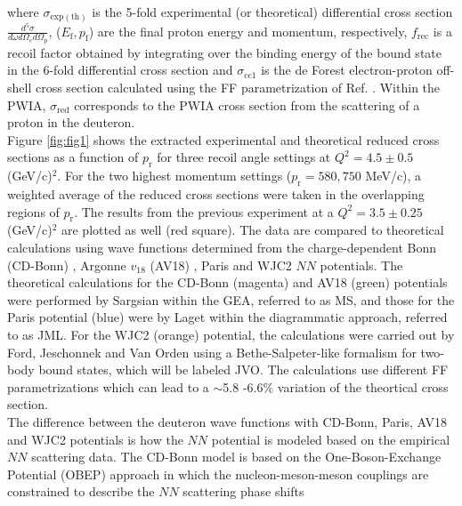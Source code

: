 \documentclass[aps,prl,twocolumn,showpacs,superscriptaddress,groupedaddress]{revtex4-2}  %
\begin{document}
\noindent where $\sigma_{\mathrm{exp(th)}}$ is the 5-fold experimental (or theoretical) differential cross section $\frac{d^{5}\sigma}{d\omega d\Omega_{e} d\Omega_{p}}$,
($E_{\mathrm{f}}, p_{\mathrm{f}}$) are the final proton energy and momentum, respectively, $f_{\mathrm{rec}}$ 
is a recoil factor \cite{cyero_phdthesis} obtained by integrating over the binding energy of the bound state in the 6-fold differential cross section and $\sigma_{\mathrm{cc1}}$ is the
de Forest \cite{DEFOREST1983} electron-proton off-shell cross section calculated using the FF parametrization of Ref. \cite{PhysRevC.69.022201}.
Within the PWIA, $\sigma_{\mathrm{red}}$ corresponds to the PWIA cross section from the scattering of a proton in the deuteron. \\
\indent Figure \ref{fig:fig1} shows the extracted experimental and theoretical reduced cross sections as a function of $p_{\mathrm{r}}$ for three recoil angle settings at $Q^{2}=4.5\pm0.5$ (GeV/c)$^{2}$.
For the two highest momentum settings ($p_{\mathrm{r}}=580, 750$ MeV/c), a weighted average of the reduced cross sections were taken in the overlapping regions of $p_{\mathrm{r}}$. The results from the previous experiment \cite{PhysRevLett.107.262501} at a $Q^{2}=3.5\pm0.25$ (GeV/c)$^{2}$ are plotted as well (red square).
The data are compared to theoretical calculations using wave functions determined from the charge-dependent Bonn (CD-Bonn) \cite{PhysRevC.63.024001}, Argonne $v_{18}$ (AV18) \cite{PhysRevC.51.38}, Paris \cite{PhysRevC.21.861} and WJC2 \cite{Gross_2007} $NN$ potentials. The theoretical calculations
for the CD-Bonn (magenta) and AV18 (green) potentials were performed by Sargsian \cite{PhysRevC.82.014612} within the GEA, referred to as MS, and those for the Paris potential (blue) were by Laget \cite{LAGET2005} within the diagrammatic approach, referred to as JML.
For the WJC2 (orange) potential, the calculations were carried out by Ford, Jeschonnek and Van Orden \cite{PhysRevC.90.064006} using a Bethe-Salpeter-like formalism for two-body bound states, which will be labeled JVO.
The calculations use different FF parametrizations which can lead to a $\sim$5.8 -6.6$\%$ variation of the theortical cross section.\\
\indent The difference between the deuteron wave functions with CD-Bonn, Paris, AV18 and WJC2 potentials is 
how the $NN$ potential is modeled based on the empirical $NN$ scattering data.
The CD-Bonn model is based on the One-Boson-Exchange Potential (OBEP) approach in which the 
nucleon-meson-meson couplings are constrained to describe the $NN$ scattering phase shifts
\end{document}
